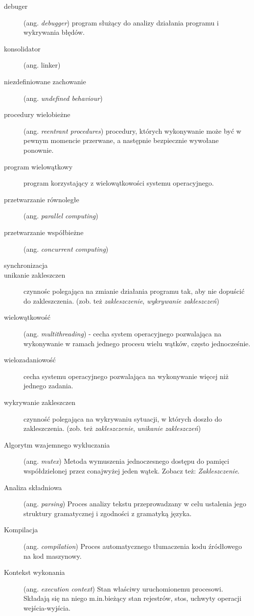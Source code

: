 \documentclass[12pt]{article}
\begin{document}
\begin{description}
	\item[debuger] (ang. \emph{debugger}) program służący do analizy działania programu i wykrywania błędów.
	\item[konsolidator] (ang. linker)
	\item[niezdefiniowane zachowanie] (ang. \emph{undefined behaviour})
	\item[procedury wielobieżne] (ang. \emph{reentrant procedures}) procedury, których wykonywanie może być w pewnym momencie przerwane, a następnie bezpiecznie wywołane ponownie.
	\item[program wielowątkowy] program korzystający z wielowątkowości systemu operacyjnego.
	\item[przetwarzanie równoległe] (ang. \emph{parallel computing})
	\item[przetwarzanie współbieżne] (ang. \emph{concurrent computing})
	\item[synchronizacja] 
	\item[unikanie zakleszczen] czynnośc polegająca na zmianie działania programu tak, aby nie dopuścić do zakleszczenia. (zob. też \emph{zakleszczenie}, \emph{wykrywanie zakleszczeń})
	\item[wielowątkowość] (ang. \emph{multithreading}) - cecha system operacyjnego pozwalająca na wykonywanie w ramach jednego procesu wielu wątków, często jednocześnie.
	\item[wielozadaniowość] cecha systemu operacyjnego pozwalająca na wykonywanie więcej niż jednego zadania.
	\item[wykrywanie zakleszczen] czynność polegająca na wykrywaniu sytuacji, w których doszło do zakleszczenia. (zob. też \emph{zakleszczenie}, \emph{unikanie zakleszczeń})
    \item[Algorytm wzajemnego wykluczania] (ang. \emph{mutex}) Metoda wymuszenia jednoczesnego dostępu do pamięci współdzielonej przez conajwyżej jeden wątek. Zobacz też: \emph{Zakleszczenie}.
    \item[Analiza składniowa] (ang. \emph{parsing}) Proces analizy tekstu przeprowadzany w celu ustalenia jego struktury gramatycznej i zgodności z gramatyką języka.
    \item[Kompilacja] (ang. \emph{compilation}) Proces automatycznego tłumaczenia kodu źródłowego na kod maszynowy.
    \item[Kontekst wykonania] (ang. \emph{execution context}) Stan właściwy uruchomionemu procesowi. Składają się na niego m.in.bieżący stan rejestrów, stos, uchwyty operacji wejścia-wyjścia.

\end{description}
\end{document}
